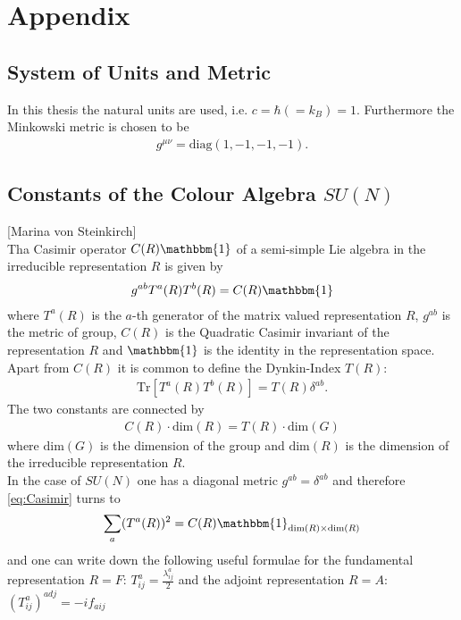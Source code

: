 \section{Appendix}


\subsection{System of Units and Metric}
In this thesis the natural units are used, i.e. $c= \hbar (= k_B) = 1$. Furthermore the Minkowski metric is chosen to be
\begin{align}
g^{\mu\nu} = \mathrm{diag}(1, -1, -1, -1).
\end{align}


\subsection{Constants of the Colour Algebra $SU(N)$}
[Marina von Steinkirch]\\
Tha Casimir operator $C(R)\mathbbm{1}$ of a semi-simple Lie algebra in the irreducible representation $R$ is given by
\begin{align}
g^{ab} T^a(R)T^b(R) = C(R)\mathbbm{1} \label{eq:Casimir}
\end{align}
where $T^a(R)$ is the $a$-th generator of the matrix valued representation $R$, $g^{ab}$ is the metric of group, $C(R)$ is the Quadratic Casimir invariant of the representation $R$ and $\mathbbm{1}$ is the identity in the representation space.\\
Apart from $C(R)$ it is common to define the Dynkin-Index $T(R)$:
\begin{align}
\mathrm{Tr}\left[T^a(R)T^b(R)\right] = T(R)\delta^{ab}.
\end{align}
The two constants are connected by
\begin{align}
C(R) \cdot \mathrm{dim}(R) = T(R) \cdot \mathrm{dim}(G)
\end{align}
where $\mathrm{dim}(G)$ is the dimension of the group and $\mathrm{dim}(R)$ is the dimension of the irreducible representation $R$.\\
In the case of $SU(N)$ one has a diagonal metric $g^{ab} = \delta^{ab}$ and therefore \ref{eq:Casimir} turns to
\begin{align}
\sum_a (T^a(R))^2 = C(R)\mathbbm{1}_{\mathrm{dim}(R) \times \mathrm{dim}(R)}
\end{align}
and one can write down the following useful formulae for the fundamental representation $R=F$: $T^a_{ij} = \frac{\lambda^a_{ij}}{2}$ and the adjoint representation $R=A$: $(T^a_{ij})^{adj} = -if_{aij}$
